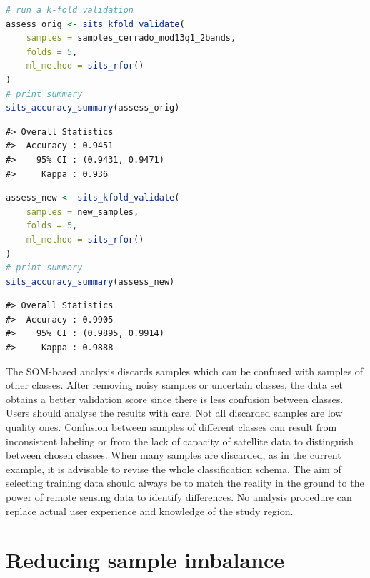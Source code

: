 \documentclass[
  11pt,
]{report}
\begin{document}
\begin{lstlisting}[language=R]
# run a k-fold validation
assess_orig <- sits_kfold_validate(
    samples = samples_cerrado_mod13q1_2bands, 
    folds = 5,
    ml_method = sits_rfor()
)
# print summary 
sits_accuracy_summary(assess_orig)
\end{lstlisting}

\begin{lstlisting}
#> Overall Statistics                            
#>  Accuracy : 0.9451          
#>    95% CI : (0.9431, 0.9471)
#>     Kappa : 0.936
\end{lstlisting}

\begin{lstlisting}[language=R]
assess_new <- sits_kfold_validate(
    samples = new_samples,
    folds = 5,
    ml_method = sits_rfor()
)
# print summary 
sits_accuracy_summary(assess_new)
\end{lstlisting}

\begin{lstlisting}
#> Overall Statistics                            
#>  Accuracy : 0.9905          
#>    95% CI : (0.9895, 0.9914)
#>     Kappa : 0.9888
\end{lstlisting}

The SOM-based analysis discards samples which can be confused with
samples of other classes. After removing noisy samples or uncertain
classes, the data set obtains a better validation score since there is
less confusion between classes. Users should analyse the results with
care. Not all discarded samples are low quality ones. Confusion between
samples of different classes can result from inconsistent labeling or
from the lack of capacity of satellite data to distinguish between
chosen classes. When many samples are discarded, as in the current
example, it is advisable to revise the whole classification schema. The
aim of selecting training data should always be to match the reality in
the ground to the power of remote sensing data to identify differences.
No analysis procedure can replace actual user experience and knowledge
of the study region.

\hypertarget{reducing-sample-imbalance}{%
\section*{Reducing sample imbalance}\label{reducing-sample-imbalance}}
\end{document}
